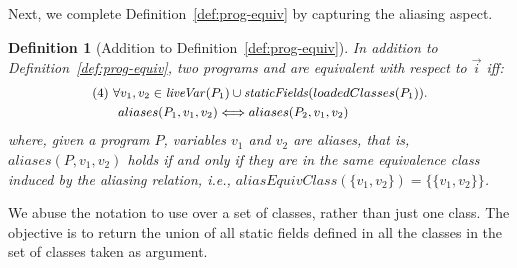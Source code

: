 \documentclass[sigconf]{acmart}
\newtheorem{definition}{Definition}
\begin{document}
Next, we complete Definition~\ref{def:prog-equiv} by capturing the aliasing aspect.

\begin{definition}[Addition to Definition~\ref{def:prog-equiv}]\label{def:prog-equiv-add}
%
In addition to Definition~\ref{def:prog-equiv},
two programs  and  are equivalent
with respect to $\vec{i}$ iff:
\[
\small
    \begin{aligned}
      & (4)~ \forall v_1,v_2 \in \mathit{liveVar}(P_1) \cup \mathit{staticFields}(loadedClasses(P_1)). \\
      & \qquad aliases(P_1, v_1, v_2) \Longleftrightarrow  aliases(P_2, v_1,v_2)
    \end{aligned}
    \]
%
where, given a program $P$, variables $v_1$ and $v_2$ are aliases, that is, $aliases(P, v_1, v_2)$ holds
if and only if they are in the same equivalence class induced by the aliasing relation,
  i.e., $aliasEquivClass(\allowbreak \{v_1,v_2\}) = \{\{v_1,v_2\}\}$.
%
\end{definition}

  We abuse the notation to use  over a set of classes, rather than just one class.
  The objective is to return the union of all static fields defined in all the classes in the set of classes taken as argument.





\end{document}
